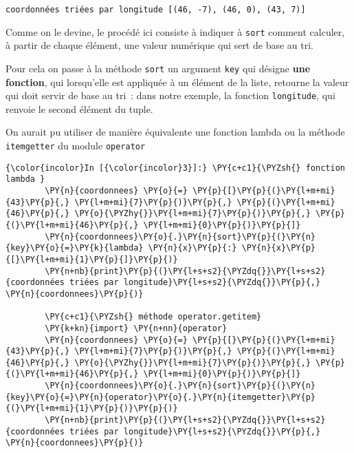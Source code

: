     \begin{Verbatim}[commandchars=\\\{\},frame=single,framerule=0.3mm,rulecolor=\color{cellframecolor}]
coordonnées triées par longitude [(46, -7), (46, 0), (43, 7)]
\end{Verbatim}

    Comme on le devine, le procédé ici consiste à indiquer à \texttt{sort}
comment calculer, à partir de chaque élément, une valeur numérique qui
sert de base au tri.

Pour cela on passe à la méthode \texttt{sort} un argument \texttt{key}
qui désigne \textbf{une fonction}, qui lorsqu'elle est appliquée à un
élément de la liste, retourne la valeur qui doit servir de base au tri~:
dans notre exemple, la fonction \texttt{longitude}, qui renvoie le
second élément du tuple.

    On aurait pu utiliser de manière équivalente une fonction lambda ou la
méthode \texttt{itemgetter} du module \texttt{operator}

    \begin{Verbatim}[commandchars=\\\{\},frame=single,framerule=0.3mm,rulecolor=\color{cellframecolor}]
{\color{incolor}In [{\color{incolor}3}]:} \PY{c+c1}{\PYZsh{} fonction lambda }
        \PY{n}{coordonnees} \PY{o}{=} \PY{p}{[}\PY{p}{(}\PY{l+m+mi}{43}\PY{p}{,} \PY{l+m+mi}{7}\PY{p}{)}\PY{p}{,} \PY{p}{(}\PY{l+m+mi}{46}\PY{p}{,} \PY{o}{\PYZhy{}}\PY{l+m+mi}{7}\PY{p}{)}\PY{p}{,} \PY{p}{(}\PY{l+m+mi}{46}\PY{p}{,} \PY{l+m+mi}{0}\PY{p}{)}\PY{p}{]}
        \PY{n}{coordonnees}\PY{o}{.}\PY{n}{sort}\PY{p}{(}\PY{n}{key}\PY{o}{=}\PY{k}{lambda} \PY{n}{x}\PY{p}{:} \PY{n}{x}\PY{p}{[}\PY{l+m+mi}{1}\PY{p}{]}\PY{p}{)}
        \PY{n+nb}{print}\PY{p}{(}\PY{l+s+s2}{\PYZdq{}}\PY{l+s+s2}{coordonnées triées par longitude}\PY{l+s+s2}{\PYZdq{}}\PY{p}{,} \PY{n}{coordonnees}\PY{p}{)}
        
        \PY{c+c1}{\PYZsh{} méthode operator.getitem}
        \PY{k+kn}{import} \PY{n+nn}{operator}
        \PY{n}{coordonnees} \PY{o}{=} \PY{p}{[}\PY{p}{(}\PY{l+m+mi}{43}\PY{p}{,} \PY{l+m+mi}{7}\PY{p}{)}\PY{p}{,} \PY{p}{(}\PY{l+m+mi}{46}\PY{p}{,} \PY{o}{\PYZhy{}}\PY{l+m+mi}{7}\PY{p}{)}\PY{p}{,} \PY{p}{(}\PY{l+m+mi}{46}\PY{p}{,} \PY{l+m+mi}{0}\PY{p}{)}\PY{p}{]}
        \PY{n}{coordonnees}\PY{o}{.}\PY{n}{sort}\PY{p}{(}\PY{n}{key}\PY{o}{=}\PY{n}{operator}\PY{o}{.}\PY{n}{itemgetter}\PY{p}{(}\PY{l+m+mi}{1}\PY{p}{)}\PY{p}{)}
        \PY{n+nb}{print}\PY{p}{(}\PY{l+s+s2}{\PYZdq{}}\PY{l+s+s2}{coordonnées triées par longitude}\PY{l+s+s2}{\PYZdq{}}\PY{p}{,} \PY{n}{coordonnees}\PY{p}{)}
\end{Verbatim}


